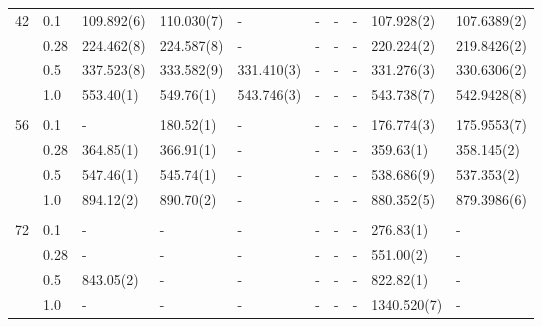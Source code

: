 {\begin{landscape}
\begin{table}
\begin{tabularx}{\hsize}{l:l|R{2.3cm}R{2.3cm}R{2.3cm}R{2.3cm}R{2.3cm}R{2.3cm}R{2.3cm}R{2.3cm}}
		42 & 0.1 & 109.892(6) & 110.030(7) & - & - & - & - &  107.928(2) & 107.6389(2) \\ 
		& 0.28 & 224.462(8) & 224.587(8) & - & - & - & - & 220.224(2) & 219.8426(2) \\
		& 0.5 & 337.523(8) & 333.582(9) & 331.410(3) & - & - & - & 331.276(3) & 330.6306(2) \\
		& 1.0 & 553.40(1) & 549.76(1) & 543.746(3) & - & - & - & 543.738(7) & 542.9428(8) \\ \hdashline \\
		
		56 & 0.1 & - & 180.52(1) & - & - & - & - & 176.774(3) & 175.9553(7) \\ 
		& 0.28 & 364.85(1) & 366.91(1) & - & - & - & - & 359.63(1) & 358.145(2) \\
		& 0.5 & 547.46(1) & 545.74(1) & - & - & - & - & 538.686(9) & 537.353(2) \\
		& 1.0 & 894.12(2) & 890.70(2) & - & - & - & - & 880.352(5) & 879.3986(6) \\ \hdashline \\
		
		72 & 0.1 & - & - & - & - & - & - & 276.83(1) & - \\ 
		& 0.28 & - & - & - & - & - & - & 551.00(2) & - \\
		& 0.5 & 843.05(2) & - & - & - & - & - & 822.82(1) & - \\
		& 1.0 & - & - & - & - & - & - & 1340.520(7) & - \\ \hline\hline
	\end{tabularx}
\end{table}


\end{landscape}}
